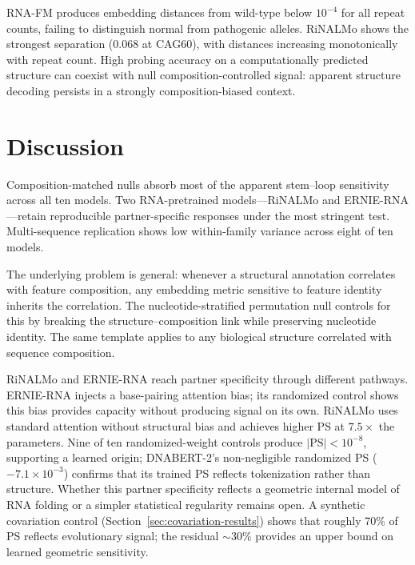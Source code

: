 \documentclass[11pt]{article}
\begin{document}
RNA-FM produces embedding distances from wild-type below $10^{-4}$ for all
repeat counts, failing to distinguish normal from pathogenic alleles.
RiNALMo shows the strongest separation (0.068 at CAG60), with distances
increasing monotonically with repeat count. High probing accuracy on a
computationally predicted structure can coexist with null
composition-controlled signal: apparent structure decoding persists in a
strongly composition-biased context.


\section{Discussion}
\label{sec:discussion}

Composition-matched nulls absorb most of the apparent stem--loop
sensitivity across all ten models. Two RNA-pretrained models---RiNALMo and
ERNIE-RNA---retain reproducible partner-specific responses under the most
stringent test. Multi-sequence replication shows low within-family
variance across eight of ten models.

The underlying problem is general: whenever a structural annotation
correlates with feature composition, any embedding metric sensitive to
feature identity inherits the correlation. The nucleotide-stratified
permutation null controls for this by breaking the structure--composition
link while preserving nucleotide identity. The same template applies to
any biological structure correlated with sequence composition.

RiNALMo and ERNIE-RNA reach partner specificity through different pathways.
ERNIE-RNA injects a base-pairing attention bias; its randomized control
shows this bias provides capacity without producing signal on its own.
RiNALMo uses standard attention without structural bias and achieves higher
PS at $7.5\times$ the parameters. Nine of ten randomized-weight controls
produce $|\text{PS}| < 10^{-8}$, supporting a learned origin; DNABERT-2's
non-negligible randomized PS ($-7.1 \times 10^{-3}$) confirms that its trained
PS reflects tokenization rather than structure. Whether
this partner specificity reflects a geometric internal model of RNA folding
or a simpler statistical regularity remains open. A synthetic
covariation control (Section~\ref{sec:covariation-results}) shows that
roughly 70\% of PS reflects evolutionary signal; the residual
$\sim$30\% provides an upper bound on learned geometric sensitivity.
\end{document}

